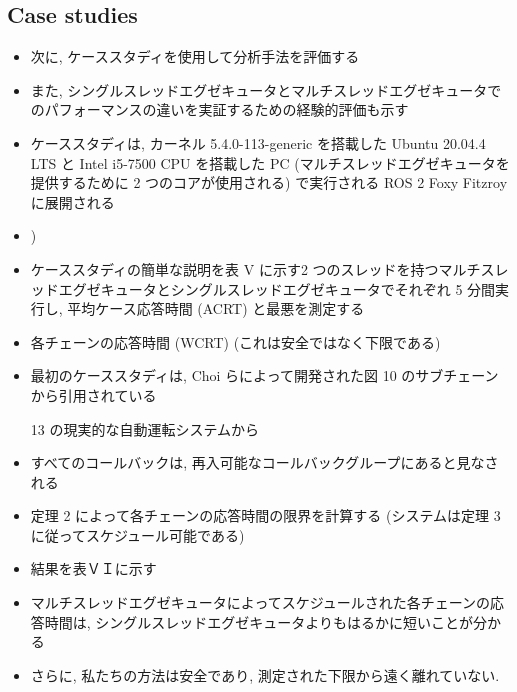 \subsection{Case studies}
\label{ssec: case studies}

\begin{frame}{}
    \begin{itemize}
        \item 次に, ケーススタディを使用して分析手法を評価する
\item また, シングルスレッドエグゼキュータとマルチスレッドエグゼキュータでのパフォーマンスの違いを実証するための経験的評価も示す
\item ケーススタディは, カーネル 5.4.0-113-generic を搭載した Ubuntu 20.04.4 LTS と Intel i5-7500 CPU を搭載した PC (マルチスレッドエグゼキュータを提供するために 2 つのコアが使用される) で実行される ROS 2 Foxy Fitzroy に展開される
\item )
    \end{itemize}
\end{frame}


\begin{frame}{}
    \begin{itemize}
        \item ケーススタディの簡単な説明を表 V に示す2 つのスレッドを持つマルチスレッドエグゼキュータとシングルスレッドエグゼキュータでそれぞれ 5 分間実行し, 平均ケース応答時間 (ACRT) と最悪を測定する
\item 各チェーンの応答時間 (WCRT) (これは安全ではなく下限である)
    \end{itemize}
\end{frame}

\begin{frame}{}
    \begin{itemize}
        \item 最初のケーススタディは, Choi らによって開発された図 10 のサブチェーンから引用されている
\item [13] の現実的な自動運転システムから
\item すべてのコールバックは, 再入可能なコールバックグループにあると見なされる
\item 定理 2 によって各チェーンの応答時間の限界を計算する (システムは定理 3 に従ってスケジュール可能である)
\item 結果を表ＶＩに示す
\item マルチスレッドエグゼキュータによってスケジュールされた各チェーンの応答時間は, シングルスレッドエグゼキュータよりもはるかに短いことが分かる
\item さらに, 私たちの方法は安全であり, 測定された下限から遠く離れていない.
    \end{itemize}
\end{frame}

